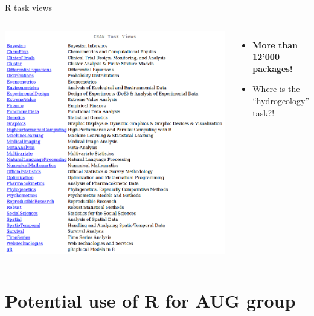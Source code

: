 \documentclass[9pt,ignorenonframetext,]{beamer}
\providecommand{\tightlist}{%
  \setlength{\itemsep}{0pt}\setlength{\parskip}{0pt}}
\newcommand{\columnsbegin}{\begin{columns}}
\newcommand{\columnsend}{\end{columns}}
\begin{document}
\begin{frame}{R task views}

\columnsbegin


\includegraphics{imgPres/rcran-task-view.png}


\begin{itemize}
\tightlist
\item
  \textbf{More than 12'000 packages!}
\item
  Where is the ``hydrogeology'' task?!
\end{itemize}

\columnsend

\end{frame}

\section{Potential use of R for AUG
group}\label{potential-use-of-r-for-aug-group}
\end{document}
